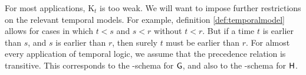 \begin{solution}
\begin{sollist}
    \item {}
    \medskip
      
   \item {}
   
  \end{sollist}
  
\end{solution}

For most applications, K$_{t}$ is too weak. We will want to impose further
restrictions on the relevant temporal models. For example, definition
\ref{def:temporalmodel} allows for cases in which $t < s$ and $s < r$ without
$t < r$. But if a time $t$ is earlier than $s$, and $s$ is earlier than $r$,
then surely $t$ must be earlier than $r$. For almost every application of
temporal logic, we assume that the precedence relation is transitive. This
corresponds to the -schema for $\operatorname{\mathsf{G}}$, and also to the -schema for
$\operatorname{\mathsf{H}}$.
\begin{principles}
  \\
\end{principles}

